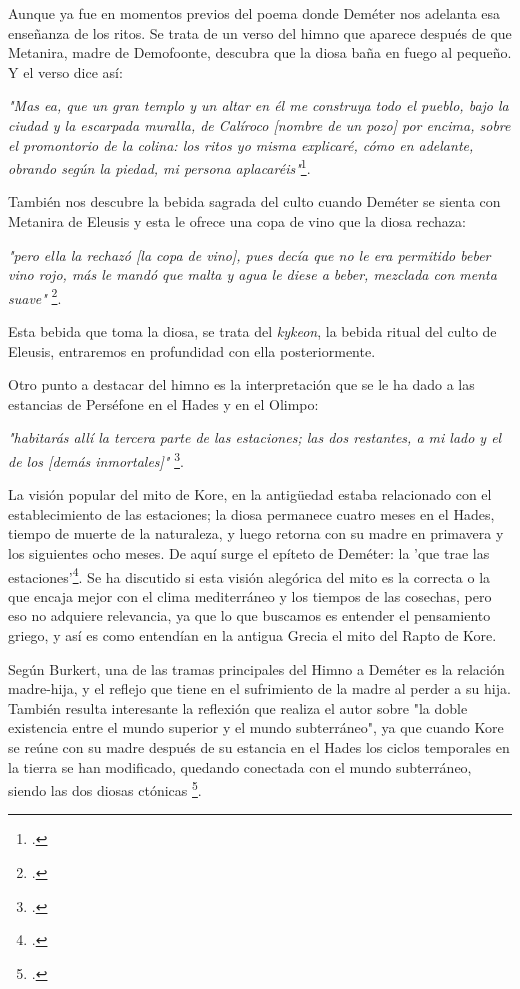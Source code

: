 Aunque ya fue en momentos previos del poema donde Deméter nos adelanta esa enseñanza de los ritos. Se trata de un verso del himno que aparece después de que Metanira, madre de Demofoonte, descubra que la diosa baña en fuego al pequeño. Y el verso dice así:

\textit{"Mas ea, que un gran templo y un altar en él me construya todo el pueblo, bajo la ciudad y la escarpada muralla, de Calíroco [nombre de un pozo] por encima, sobre el promontorio de la colina: los ritos yo misma explicaré, cómo en adelante, obrando según la piedad, mi persona aplacaréis"}\footcite[71]{b.torresHimnoHomericoDemeter2001}.

También nos descubre la bebida sagrada del culto cuando Deméter se sienta con Metanira de Eleusis y esta le ofrece una copa de vino que la diosa rechaza:

\textit{"pero ella la rechazó [la copa de vino], pues decía que no le era permitido beber vino rojo, más le mandó que malta y agua le diese a beber, mezclada con menta suave"} \footcite[65]{b.torresHimnoHomericoDemeter2001}.

Esta bebida que toma la diosa, se trata del \textit{kykeon}, la bebida ritual del culto de Eleusis, entraremos en profundidad con ella posteriormente.

Otro punto a destacar del himno es la interpretación que se le ha dado a las estancias de Perséfone en el Hades y en el Olimpo:

\textit{"habitarás allí la tercera parte de las estaciones; las dos restantes, a mi lado y el de los [demás inmortales]"} \footcite[81]{b.torresHimnoHomericoDemeter2001}. 

La visión popular del mito de Kore, en la antigüedad estaba relacionado con el establecimiento de las estaciones; la diosa permanece cuatro meses en el Hades, tiempo de muerte de la naturaleza, y luego retorna con su madre en primavera y los siguientes ocho meses. De aquí surge el epíteto de Deméter: la 'que trae las estaciones'\footcite[107]{b.torresHimnoHomericoDemeter2001}. Se ha discutido si esta visión alegórica del mito es la correcta o la que encaja mejor con el clima mediterráneo y los tiempos de las cosechas, pero eso no adquiere relevancia, ya que lo que buscamos es entender el pensamiento griego, y así es como entendían en la antigua Grecia el mito del Rapto de Kore.

Según Burkert, una de las tramas principales del Himno a Deméter es la relación madre-hija, y el reflejo que tiene en el sufrimiento de la madre al perder a su hija. También resulta interesante la reflexión que realiza el autor sobre "la doble existencia entre el mundo superior y el mundo subterráneo", ya que cuando Kore se reúne con su madre después de su estancia en el Hades los ciclos temporales en la tierra se han modificado, quedando conectada con el mundo subterráneo, siendo las dos diosas ctónicas \footcite[217-218]{burkertReligionGriegaArcaica2007}.                                      


